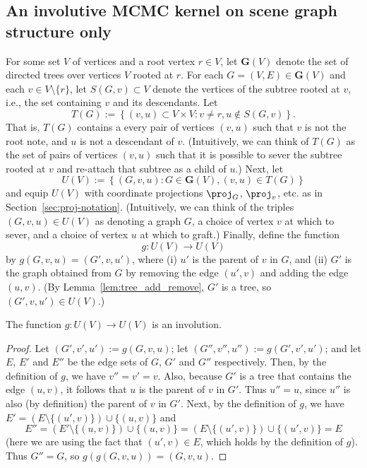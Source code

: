 \subsection{An involutive MCMC kernel on scene graph structure only}

For some set $V$ of vertices and a root vertex $r \in V$, let $\mathbf{G}(V)$ denote the set of directed trees over vertices $V$ rooted at $r$.
For each $G = (V, E) \in \mathbf{G}(V)$ and each $v \in V \setminus \{r\}$, let $S(G, v) \subset V$ denote the vertices of the subtree rooted at $v$, i.e., the set containing $v$ and its descendants.
Let
\begin{equation}
T(G) := \left\{
    (v, u) \subset V \times V : v \neq r, u \notin S(G, v)
\right\}.
\end{equation}
That is, $T(G)$ contains a every pair of vertices $(v, u)$ such that $v$ is not the root note, and $u$ is not a descendant of $v$.
(Intuitively, we can think of $T(G)$ as the set of pairs of vertices $(v, u)$ such that it is possible to sever the subtree rooted at $v$ and re-attach that subtree as a child of $u$.)
Next, let
\begin{equation}
U(V) := \left\{
    (G, v, u) : G \in \mathbf{G}(V), (v, u) \in T(G)
\right\}
\end{equation}
and equip $U(V)$ with coordinate projections $\proj_G$, $\proj_v$, etc.{} as in Section~\ref{sec:proj-notation}.
(Intuitively, we can think of the triples $(G, v, u) \in U(V)$ as denoting a graph $G$, a choice of vertex $v$ at which to sever, and a choice of vertex $u$ at which to graft.)
Finally, define the function
\[ g: U(V) \to U(V) \]
by $g(G, v, u) = (G', v, u')$, where
(i) $u'$ is the parent of $v$ in $G$, and
(ii) $G'$ is the graph obtained from $G$ by removing the edge $(u', v)$ and adding the edge $(u, v)$.
(By Lemma~\ref{lem:tree_add_remove}, $G'$ is a tree, so $(G', v, u') \in U(V)$.)

\begin{proposition}
The function $g: U(V) \to U(V)$ is an involution.
\end{proposition}
\begin{proof}
Let $(G', v', u') := g(G, v, u)$; let $(G'', v'', u'') := g(G', v', u')$; and let $E$, $E'$ and $E''$ be the edge sets of $G$, $G'$ and $G''$ respectively.
Then, by the definition of $g$, we have $v'' = v' = v$.
Also, because $G'$ is a tree that contains the edge $(u, v)$, it follows that $u$ is the parent of $v$ in $G'$.
Thus $u'' = u$, since $u''$ is also (by definition) the parent of $v$ in $G'$.
Next, by the definition of $g$, we have $E' = (E \setminus \{(u', v)\}) \cup \{(u, v)\}$ and
\[
    E'' = (E' \setminus \{(u, v)\}) \cup \{(u, v)\} = (E \setminus \{(u', v)\}) \cup \{(u', v)\} = E
\]
(here we are using the fact that $(u', v) \in E$, which holds by the definition of $g$).
Thus $G'' = G$, so $g(g(G, v, u)) = (G, v, u)$.
\end{proof}



